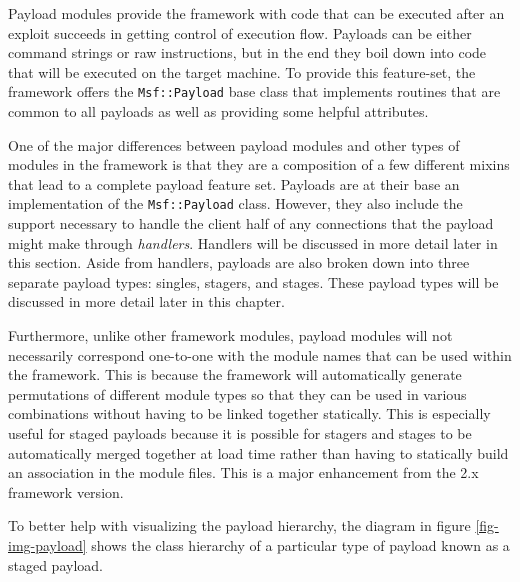 \documentclass{report}
\begin{document}
\par
Payload modules provide the framework with code that can be executed
after an exploit succeeds in getting control of execution flow.
Payloads can be either command strings or raw instructions, but in
the end they boil down into code that will be executed on the target
machine.  To provide this feature-set, the framework offers the
\texttt{Msf::Payload} base class that implements routines that are
common to all payloads as well as providing some helpful attributes.

\par
One of the major differences between payload modules and other types
of modules in the framework is that they are a composition of a few
different mixins that lead to a complete payload feature set.
Payloads are at their base an implementation of the
\texttt{Msf::Payload} class.  However, they also include the support
necessary to handle the client half of any connections that the
payload might make through \textit{handlers}.  Handlers will be
discussed in more detail later in this section.  Aside from
handlers, payloads are also broken down into three separate payload
types: singles, stagers, and stages.  These payload types will be
discussed in more detail later in this chapter.

\par
Furthermore, unlike other framework modules, payload modules will
not necessarily correspond one-to-one with the module names that can
be used within the framework.  This is because the framework will
automatically generate permutations of different module types so
that they can be used in various combinations without having to be
linked together statically.  This is especially useful for staged
payloads because it is possible for stagers and stages to be
automatically merged together at load time rather than having to
statically build an association in the module files.  This is a
major enhancement from the 2.x framework version.

\par
To better help with visualizing the payload hierarchy, the diagram
in figure \ref{fig-img-payload} shows the class hierarchy of a
particular type of payload known as a staged payload.
\end{document}
